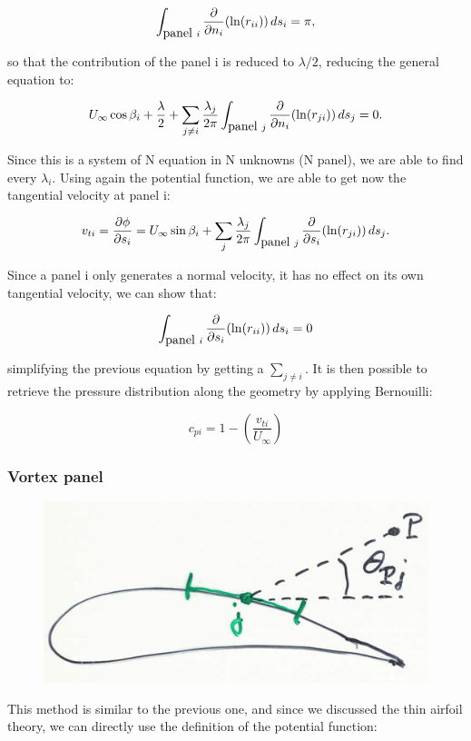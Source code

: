 	 \begin{equation}
	 \int _{\mbox{panel }i} \frac{\D}{\D n_i} (\ln (r_{ii})) \, ds_i = \pi,
	 \end{equation}
	 
	 so that the contribution of the panel i is reduced to $\lambda /2$, reducing the general equation to: 
	 
	 \begin{equation}
	 U_\infty \cos \beta _i +\frac{\lambda}{2}+ \sum _{j\neq i} \frac{\lambda _j}{2\pi} \int _{\mbox{panel }j} \frac{\D}{\D n_i} (\ln (r_{ji})) \, ds_j = 0.
	 \end{equation}
	 
	 Since this is a system of N equation in N unknowns (N panel), we are able to find every $\lambda _i$. Using again the potential function, we are able to get now the tangential velocity at panel i: 
	 
	 \begin{equation}
	 v_{ti} = \frac{\D \phi}{\D s_i} = U_\infty \sin \beta _i + \sum _j \frac{\lambda _j}{2\pi} \int _{\mbox{panel }j} \frac{\D}{\D s_i} (\ln (r_{ji})) \, ds_j .
	 \end{equation}
	 
	 Since a panel i only generates a normal velocity, it has no effect on its own tangential velocity, we can show that: 
	 
	 \begin{equation}
	 \int _{\mbox{panel }i} \frac{\D}{\D s_i} (\ln (r_{ii})) \, ds_i = 0 
	 \end{equation}
	 
	 simplifying the previous equation by getting a $\sum _{j\neq i}$. It is then possible to retrieve the pressure distribution along the geometry by applying Bernouilli: 
	 
	 \begin{equation}
	 c_{pi} = 1- \left(\frac{v_{ti}}{U_\infty} \right)
	 \end{equation}
	 
\subsubsection{Vortex panel}
	\begin{figure}
	\vspace{-5mm}
	\includegraphics[scale=0.25]{ch2/42}
	\end{figure}
	This method is similar to the previous one, and since we discussed the thin airfoil theory, we can directly use the definition of the potential function:
	
